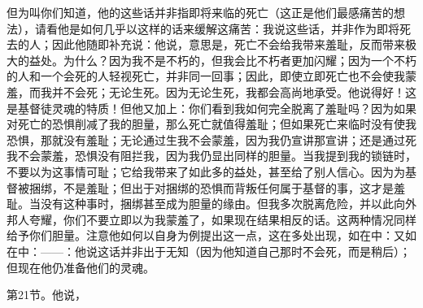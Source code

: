 但为叫你们知道，他的这些话并非指即将来临的死亡（这正是他们最感痛苦的想法），请看他是如何几乎以这样的话来缓解这痛苦：我说这些话，并非作为即将死去的人；因此他随即补充说：他说，意思是，死亡不会给我带来羞耻，反而带来极大的益处。为什么？因为我不是不朽的，但我会比不朽者更加闪耀；因为一个不朽的人和一个会死的人轻视死亡，并非同一回事；因此，即使立即死亡也不会使我蒙羞，而我并不会死；无论生死。因为无论生死，我都会高尚地承受。他说得好！这是基督徒灵魂的特质！但他又加上：你们看到我如何完全脱离了羞耻吗？因为如果对死亡的恐惧削减了我的胆量，那么死亡就值得羞耻；但如果死亡来临时没有使我恐惧，那就没有羞耻；无论通过生我不会蒙羞，因为我仍宣讲那宣讲；还是通过死我不会蒙羞，恐惧没有阻拦我，因为我仍显出同样的胆量。当我提到我的锁链时，不要以为这事情可耻；它给我带来了如此多的益处，甚至给了别人信心。因为为基督被捆绑，不是羞耻；但出于对捆绑的恐惧而背叛任何属于基督的事，这才是羞耻。当没有这种事时，捆绑甚至成为胆量的缘由。但我多次脱离危险，并以此向外邦人夸耀，你们不要立即以为我蒙羞了，如果现在结果相反的话。这两种情况同样给予你们胆量。注意他如何以自身为例提出这一点，这在多处出现，如在中：又如在中：——：他说这话并非出于无知（因为他知道自己那时不会死，而是稍后）；但现在他仍准备他们的灵魂。\par

第21节。他说，\par

